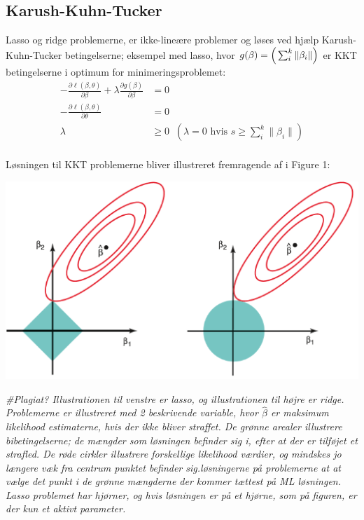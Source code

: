 \documentclass[11pt,a4paper]{article}
\begin{document}
\subsection{Karush-Kuhn-Tucker}
Lasso og ridge problemerne, er ikke-lineære problemer og løses ved hjælp Karush-Kuhn-Tucker betingelserne; eksempel med lasso, hvor $g(\beta)=\Big{(}\sum_i^k\|\beta_i\| \Big{)}$ er KKT betingelserne i optimum for minimeringsproblemet:
\begin{align}
    -\frac{\partial\ell(\beta,\theta)}{\partial\beta}+\lambda\frac{\partial g(\beta)}{\partial \beta}&=0\\
    -\frac{\partial\ell(\beta,\theta)}{\partial\theta}&=0\\
    \lambda&\geq 0 \;\;(\lambda=0\text{ hvis }s\geq\sum_i^k\|\beta_i\|)
\end{align}\\
Løsningen til KKT problemerne bliver illustreret fremragende af i Figure 1: \\
\begin{center}
\includegraphics[scale=0.8]{GLR.PNG}   
\end{center}
\textit{\#Plagiat? Illustrationen til venstre er lasso, og illustrationen til højre er ridge. Problemerne er illustreret med 2 beskrivende variable, hvor $\hat{\beta}$ er maksimum likelihood estimaterne, hvis der ikke bliver straffet. De grønne arealer illustrere bibetingelserne; de mængder som løsningen befinder sig i, efter at der er tilføjet et strafled. De røde cirkler illustrere forskellige likelihood værdier, og mindskes jo længere væk fra centrum punktet befinder sig.løsningerne på problemerne at at vælge det punkt i de grønne mængderne der kommer tættest på ML løsningen. Lasso problemet har hjørner, og hvis løsningen er på et hjørne, som på figuren, er der kun et aktivt parameter.}
\end{document}
